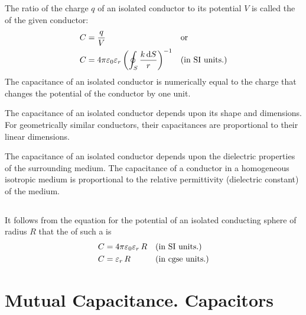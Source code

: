 \subsection{}\label{17.1.2}The ratio of the charge $q$ of an isolated conductor to its potential $V$ is called the  of the given conductor:
\begin{align*}
C & = \frac{q}{V} && \text{or} \\
C & = 4 \pi \varepsilon_{0}\varepsilon_{r} \left( \oint_{S} \frac{k \, \dd S}{r} \right)^{-1} && \text{(in SI units.)}
\end{align*}
The capacitance of an isolated conductor is numerically equal to the charge that changes the potential of the conductor by one unit.

The capacitance of an isolated conductor depends upon its shape and dimensions. For geometrically similar conductors, their capacitances are proportional to their linear dimen­sions.

The capacitance of an isolated conductor depends upon the dielectric properties of the surrounding medium. The capacitance of a conductor in a homogeneous isotropic medium is proportional to the relative permittivity (dielectric constant)  of the medium.

\subsection{}\label{17.1.3} It follows from the equation for the potential of an isolated conducting sphere of radius $R$  that the  of such a  is
\begin{align*}
C & = 4 \pi \varepsilon_{0}\varepsilon_{r} \, R && \text{(in SI units.)} \\
C & = \varepsilon_{r}\,R && \text{(in cgse units.)}
\end{align*}




\section{Mutual Capacitance. Capacitors}
\label{sec-17.2}

